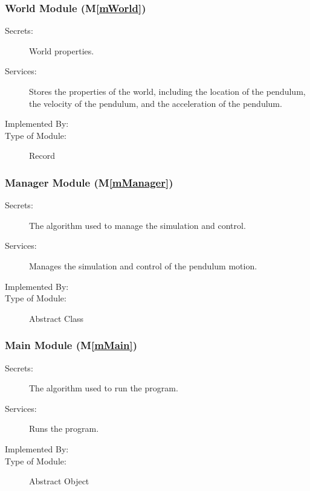 \documentclass[12pt, titlepage]{article}
\newcommand{\mref}[1]{M\ref{#1}}
\begin{document}
\subsubsection{World Module (\mref{mWorld})}

\begin{description}
\item[Secrets:] World properties.
\item[Services:] Stores the properties of the world, including the location of the pendulum, the
                 velocity of the pendulum, and the acceleration of the pendulum.
\item[Implemented By:] \progname{}
\item[Type of Module:] Record
\end{description}

\subsubsection{Manager Module (\mref{mManager})}

\begin{description}
\item[Secrets:] The algorithm used to manage the simulation and control.
\item[Services:] Manages the simulation and control of the pendulum motion.
\item[Implemented By:] \progname{}
\item[Type of Module:] Abstract Class
\end{description}

\subsubsection{Main Module (\mref{mMain})}

\begin{description}
\item[Secrets:] The algorithm used to run the program.
\item[Services:] Runs the program.
\item[Implemented By:] \progname{}
\item[Type of Module:] Abstract Object
\end{description}
\end{document}
